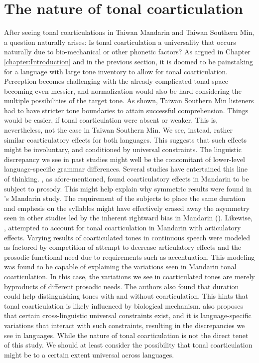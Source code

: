 \section{The nature of tonal coarticulation}
After seeing tonal coarticulations in Taiwan Mandarin and Taiwan Southern Min, a question naturally arises: Is tonal coarticulation a universality that occurs naturally due to bio-mechanical or other phonetic factors? As argued in Chapter \ref{chapter:Introduction} and in the previous section, it is doomed to be painstaking for a language with large tone inventory to allow for tonal coarticulation. Perception becomes challenging with the already complicated tonal space becoming even messier, and normalization would also be hard considering the multiple possibilities of the target tone. As shown, Taiwan Southern Min listeners had to have stricter tone boundaries to attain successful comprehension. Things would be easier, if tonal coarticulation were absent or weaker. This is, nevertheless, not the case in Taiwan Southern Min. We see, instead, rather similar coarticulatory effects for both languages. This suggests that such effects might be involuntary, and conditioned by universal constraints. The linguistic discrepancy we see in past studies might well be the concomitant of lower-level language-specific grammar differences. Several studies have entertained this line of thinking. \cite{ShihSproat1992}, as afore-mentioned, found coarticulatory effects in Mandarin to be subject to prosody. This might help explain why symmetric results were found in \cite{Shen1990}'s Mandarin study. The requirement of the subjects to place the same duration and emphesis on the syllables might have effectively erased away the asymmetry seen in other studies led by the inherent rightward bias in Mandarin (\citealp{Hyman2007}). Likewise, \cite{Haoetal2018}, attempted to account for tonal coarticulation in Mandarin with articulatory effects. Varying results of coarticulated tones in continuous speech were modeled as factored by competition of attempt to decrease articulatory effects and the prosodic functional need due to requirements such as accentuation. This modeling was found to be capable of explaining the variations seen in Mandarin tonal coarticulation. In this case, the variations we see in coarticulated tones are merely byproducts of different prosodic needs. The authors also found that duration could help distinguishing tones with and without coarticulation. This hints that tonal coarticulation is likely influenced by biological mechanism. \cite{Flemming2011} also proposes that certain cross-linguistic universal constraints exist, and it is language-specific variations that interact with such constraints, resulting in the discrepancies we see in languages. While the nature of tonal coarticulation is not the direct tenet of this study. We should at least consider the possibility that tonal coarticulation might be to a certain extent universal across languages.


